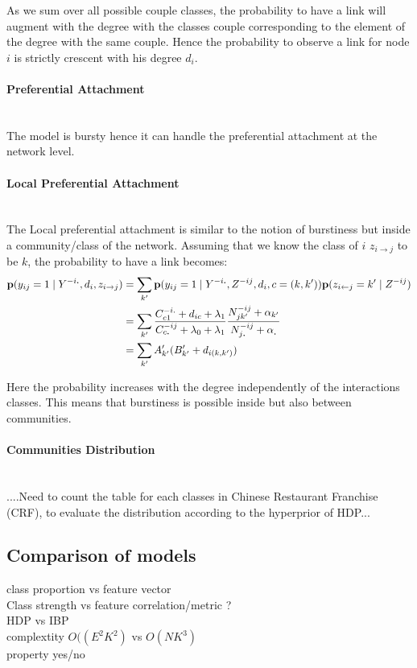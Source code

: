 \documentclass[a4paper, 12pt]{article}
\begin{document}
As we sum over all possible couple classes, the probability to have a link will augment with the degree with the classes couple corresponding to the element of the degree with the same couple. Hence the probability to observe a link for node $i$ is strictly crescent with his degree $d_i$. 

\paragraph{Preferential Attachment}~\\

The model is bursty hence it can handle the preferential attachment at the network level.

\paragraph{Local Preferential Attachment}~\\

The Local preferential attachment is similar to the notion of burstiness but inside a community/class of the network. Assuming that we know the class of $i$ $z_{i\rightarrow j}$ to be $k$, the probability to have a link becomes: 
\begin{align}
\mathbf{p}(y_{ij}=1 \mid Y^{-i\bm{.}}, d_i,z_{i\rightarrow j})  &= \sum_{k'} \mathbf{p}(y_{ij}=1 \mid Y^{-i\bm{.}}, Z^{-ij}, d_i , c=(k,k')) \mathbf{p}(z_{i\leftarrow j}=k' \mid Z^{-ij} ) \\
&= \sum_{k'} \frac{C_{c1}^{-i.} + d_{ic} + \lambda_1}{C_{c\bm{.}}^{-ij} + \lambda_0 + \lambda_1} \frac{N_{jk'}^{-ij} + \alpha_{k'}}{ N_{j\bm{.}}^{-ij} + \alpha_{\bm{.}} } \\
&= \sum_{k'} A'_{k'} (B'_{k'} + d_{i(k,k')})
\end{align}

Here the probability increases with the degree independently of the interactions classes. This means that burstiness is possible inside but also between communities.

\paragraph{Communities Distribution}~\\

....Need to count the table for each classes in Chinese Restaurant Franchise (CRF), to evaluate the distribution according to the hyperprior of HDP...


\subsection{Comparison of models}
class proportion vs feature vector \\
Class strength vs feature correlation/metric ? \\
HDP vs IBP \\
complextity $O((E^2K^2)$ vs $O(NK^3)$ \\
property yes/no
\end{document}
